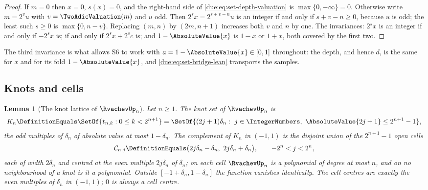\documentclass[11pt,oneside]{article}
\theoremstyle{plain}
\newtheorem{lemma}[theorem]{Lemma}
\theoremstyle{definition}
\theoremstyle{remark}
\newcommand{\upn}[1]{\RvachevUp_{#1}}
\newcommand{\dep}[1]{s\!\left(#1\right)}                    %
\begin{document}
\begin{proof}
If $m=0$ then $x=0$, $\dep{x}=0$, and the right-hand side of
\cref{due:eq:set-depth-valuation} is $\max\{0,-\infty\}=0$.  Otherwise
write $m=2^{v}u$ with $v=\TwoAdicValuation(m)$ and $u$ odd.  Then
$2^{s}x=2^{s+v-n}u$ is an integer if and only if $s+v-n\ge0$, because $u$
is odd; the least such $s\ge0$ is $\max\{0,n-v\}$.  Replacing $(m,n)$ by
$(2m,n+1)$ increases both $v$ and $n$ by one.  The invariances: $2^{s}x$
is an integer if and only if $-2^{s}x$ is; if and only if
$2^{s}x+2^{s}c$ is; and $1-\AbsoluteValue{x}$ is $1-x$ or $1+x$, both
covered by the first two.
\end{proof}

The third invariance is what allows S6 to work with $a=1-\AbsoluteValue{x}\in[0,1]$
throughout: the depth, and hence $d$, is the same for $x$ and for its fold
$1-\AbsoluteValue{x}$, and \cref{due:eq:set-bridge-lean} transports the
samples.

\subsection{Knots and cells}
\label{due:sec:set-cells}

\begin{lemma}[The knot lattice of $\upn{n}$]
\label{due:lem:set-knots}
Let $n\ge1$.  The knot set of $\upn{n}$ is
\begin{equation}
 K_n\DefinitionEquals\SetOf{t_{n,k}:0\le k<2^{n+1}}
 =\SetOf{(2j+1)\delta_n:\ j\in\IntegerNumbers,\ \AbsoluteValue{2j+1}\le2^{n+1}-1},
 \label{due:eq:set-knot-set}
\end{equation}
the odd multiples of $\delta_n$ of absolute value at most $1-\delta_n$.
The complement of $K_n$ in $(-1,1)$ is the disjoint union of the
$2^{n+1}-1$ open cells
\begin{equation}
 \mathcal C_{n,j}\DefinitionEquals\bigl(2j\delta_n-\delta_n,\ 2j\delta_n+\delta_n\bigr),
 \qquad -2^{n}<j<2^{n},
 \label{due:eq:set-cells}
\end{equation}
each of width $2\delta_n$ and centred at the even multiple $2j\delta_n$ of
$\delta_n$; on each cell $\upn{n}$ is a polynomial of degree at most $n$,
and on no neighbourhood of a knot is it a polynomial.  Outside
$[-1+\delta_n,1-\delta_n]$ the function vanishes identically.  The cell
centres are exactly the even multiples of $\delta_n$ in $(-1,1)$; $0$ is
always a cell centre.
\end{lemma}
\end{document}
